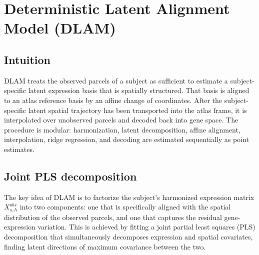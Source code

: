 \documentclass[11pt]{article}
\numberwithin{equation}{section}
\begin{document}
\section{Deterministic Latent Alignment Model (DLAM)}
\subsection{Intuition}
DLAM treats the observed parcels of a subject as
sufficient to estimate a subject-specific latent expression basis that is spatially
structured.  That basis is aligned to an atlas reference basis by an affine change of
coordinates.  After the subject-specific latent spatial trajectory has been transported
into the atlas frame, it is interpolated over unobserved parcels and decoded back into
gene space.  The procedure is modular: harmonization, latent decomposition, affine
alignment, interpolation, ridge regression, and decoding are estimated sequentially as
point estimates.

\subsection{Joint PLS decomposition}
\label{sec:det-pls}

The key idea of DLAM is to factorize the subject's harmonized
expression matrix $X_{s,h}^{obs}$ into two components: one that is specifically
aligned with the spatial distribution of the observed parcels, and one that captures
the residual gene-expression variation.  This is achieved by fitting a joint partial
least squares (PLS) decomposition that simultaneously decomposes expression and
spatial covariates, finding latent directions of maximum covariance between the two.
\end{document}
